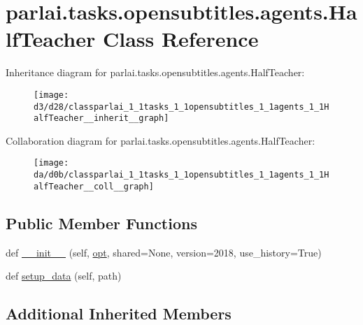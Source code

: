 \hypertarget{classparlai_1_1tasks_1_1opensubtitles_1_1agents_1_1HalfTeacher}{}\section{parlai.\+tasks.\+opensubtitles.\+agents.\+Half\+Teacher Class Reference}
\label{classparlai_1_1tasks_1_1opensubtitles_1_1agents_1_1HalfTeacher}


Inheritance diagram for parlai.\+tasks.\+opensubtitles.\+agents.\+Half\+Teacher\+:
\nopagebreak
\begin{figure}[H]
\begin{center}
\leavevmode
\texttt{[image: d3/d28/classparlai\_1\_1tasks\_1\_1opensubtitles\_1\_1agents\_1\_1HalfTeacher\_\_inherit\_\_graph]}
\end{center}
\end{figure}


Collaboration diagram for parlai.\+tasks.\+opensubtitles.\+agents.\+Half\+Teacher\+:
\nopagebreak
\begin{figure}[H]
\begin{center}
\leavevmode
\texttt{[image: da/d0b/classparlai\_1\_1tasks\_1\_1opensubtitles\_1\_1agents\_1\_1HalfTeacher\_\_coll\_\_graph]}
\end{center}
\end{figure}
\subsection*{Public Member Functions}
\begin{DoxyCompactItemize}
\item 
def \hyperlink{classparlai_1_1tasks_1_1opensubtitles_1_1agents_1_1HalfTeacher_aea4e464ad2d0ac4af96d426b171324bc}{\+\_\+\+\_\+init\+\_\+\+\_\+} (self, \hyperlink{classparlai_1_1core_1_1teachers_1_1FbDialogTeacher_af7a9ec497b9cd0292d7b8fa220da7c28}{opt}, shared=None, version=\textquotesingle{}2018\textquotesingle{}, use\+\_\+history=True)
\item 
def \hyperlink{classparlai_1_1tasks_1_1opensubtitles_1_1agents_1_1HalfTeacher_a36081b74536cdad3bc3673b324da1f02}{setup\+\_\+data} (self, path)
\end{DoxyCompactItemize}
\subsection*{Additional Inherited Members}


